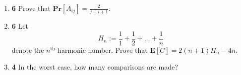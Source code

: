 \documentclass[12pt]{article}
\theoremstyle{plain}
\theoremstyle{definition}
\theoremstyle{remark}
\renewcommand{\Pr}{\textbf{Pr}}
\newcommand{\E}{\textbf{E}}
\newcommand{\pts}[1]{\lbrack\textbf{#1}\rbrack}
\begin{document}
\begin{enumerate}
\item \pts{6} Prove that $\Pr[A_{ij}]=\frac2{j-i+1}$.

\begin{comment}\begin{tcolorbox}
Since each of $\ell_i,\ell_{i+1},\dots,\ell_j$ have an equal probability of being chosen first as a pivot, the probability that $\ell_i$ or $\ell_j$ are chosen first is $\frac2{j-i+1}$. By Problem 18, this is $\Pr[A_{ij}]$.
\end{tcolorbox}\end{comment}

\item \pts{6} Let \[H_n:=\frac11+\frac12+\dots+\frac1n\] denote the $n^{\text{th}}$ harmonic number. Prove that $\E[C]=2(n+1)H_n-4n$.

\begin{comment}\begin{tcolorbox}
By Problems 17 and 19, we have \begin{align*}\E[C]&=\sum_{i=1}^n\sum_{j=i+1}^n\frac2{j-i+1}=\sum_{i=1}^n\sum_{j=2}^{n-i+1}\frac2j\\&=\sum_{i=1}^n(2H_{n-i+1}-2)=2\sum_{i=1}^nH_i-2n\end{align*} Now we notice that \[[(i+1)H_i-i]-[iH_{i-1}-(i-1)]=i(H_i-H_{i-1})+H_i-1=H_i\] so that \[\sum_{i=1}^nH_i=(n+1)H_n-n\]
\end{tcolorbox}\end{comment}

\item \pts{4} In the worst case, how many comparisons are made?

\begin{comment}\begin{tcolorbox}
Suppose every time we choose the smallest element in the set. Then the algorithm is identical to Sorting Algorithm \#1, so there are $\frac{n(n-1)}2$ comparisons made in the worst case.

\par More formally, let $W_n$ be the maximum number of comparisons on a list of size $n$.  We prove that $W_n=\tfrac{n(n-1)}2$ by strong induction on $n$.  Base cases are easy (in particular, one can check that this holds for $n=0$ and $n=1$).  For the inductive step, note that after the initial $n-1$ comparisons the list $L$ is split into two lists of size $k$ and $n-1-k$.  Thus \[W_n = n-1 + \max_{0\leq k\leq n-1}\left(W_k + W_{n-1-k}\right) = n-1 + \max_{0\leq k \leq n-1}\left(k^2-nk+\dfrac{n^2-3n+2}2\right) = n-1 + \dfrac{n^2-3n+2}2 = \dfrac{n(n-1)}2.\]
\end{tcolorbox}\end{comment}


\end{enumerate}
\end{document}
